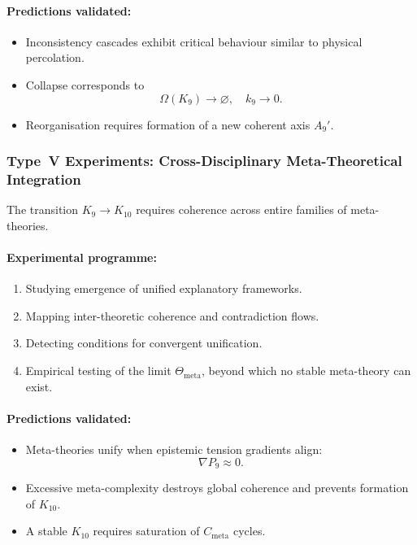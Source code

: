 \paragraph{Predictions validated:}

\begin{itemize}
    \item Inconsistency cascades exhibit critical behaviour 
          similar to physical percolation.
    \item Collapse corresponds to 
          \[
              \Omega(K_9) \to \varnothing,\quad k_9 \to 0.
          \]
    \item Reorganisation requires formation of a new coherent axis $A_9'$.
\end{itemize}



\subsubsection{Type~V Experiments: Cross-Disciplinary Meta-Theoretical Integration}

The transition $K_9 \to K_{10}$ requires coherence across entire
families of meta-theories.

\paragraph{Experimental programme:}

\begin{enumerate}
    \item Studying emergence of unified explanatory frameworks.
    \item Mapping inter-theoretic coherence and contradiction flows.
    \item Detecting conditions for convergent unification.
    \item Empirical testing of the limit 
          $\Theta_{\mathrm{meta}}$, beyond which no stable 
          meta-theory can exist.
\end{enumerate}

\paragraph{Predictions validated:}

\begin{itemize}
    \item Meta-theories unify when epistemic tension gradients align:
          \[
              \nabla P_9 \approx 0.
          \]
    \item Excessive meta-complexity destroys global coherence and
          prevents formation of $K_{10}$.
    \item A stable $K_{10}$ requires saturation of $C_{\mathrm{meta}}$ cycles.
\end{itemize}



